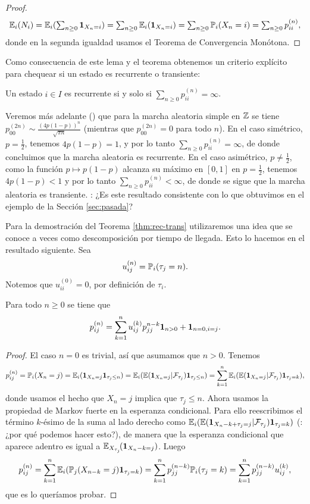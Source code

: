 \begin{proof}
\[\textstyle\mathbb{E}_i(N_i)=\mathbb{E}_i(\sum_{n\geq0}\mathbf{1}_{X_n=i})=\sum_{n\geq0}\mathbb{E}_i(\mathbf{1}_{X_n=i})=\sum_{n\geq0}\mathbb{P}_i(X_n=i)=\sum_{n\geq0}p_{ii}^{(n)},\]
donde en la segunda igualdad usamos el Teorema de Convergencia Monótona.
\end{proof}

Como consecuencia de este lema y el teorema obtenemos un criterio explícito para chequear si un estado es recurrente o transiente:

\begin{cor}
Un estado $i\in I$ es recurrente si y solo si $\sum_{n\geq0}p_{ii}^{(n)}=\infty$.
\end{cor}

\begin{ex}\label{eq:srw-rec-1}
Veremos más adelante (\ucmark) que para la marcha aleatoria simple en $\mathbb{Z}$ se tiene $p^{(2n)}_{00}\sim\frac{(4p(1-p))^n}{\sqrt{\pi n}}$ (mientras que $p^{(2n)}_{00}=0$ para todo $n$).
En el caso simétrico, $p=\frac12$, tenemos $4p(1-p)=1$, y por lo tanto $\sum_{n\geq0}p_{ii}^{(n)}=\infty$, de donde concluimos que la marcha aleatoria es recurrente.
En el caso asimétrico, $p\neq\frac12$, como la función $p\longmapsto p(1-p)$ alcanza su máximo en $[0,1]$ en $p=\frac12$, tenemos $4p(1-p)<1$ y por lo tanto $\sum_{n\geq0}p_{ii}^{(n)}<\infty$, de donde se sigue que la marcha aleatoria es transiente.
\uexer: ¿Es este resultado consistente con lo que obtuvimos en el ejemplo de la Sección \ref{sec:pasada}?
\end{ex}

Para la demostración del Teorema \ref{thm:rec-trans} utilizaremos una idea que se conoce a veces como descomposición por tiempo de llegada.
Esto lo hacemos en el resultado siguiente.
Sea
\[u^{(n)}_{ij}=\mathbb{P}_i(\tau_j=n).\]
Notemos que $u^{(0)}_{ii}=0$, por definición de $\tau_i$.

\begin{lem}
Para todo $n\geq0$ se tiene que
\[p_{ij}^{(n)}=\sum_{k=1}^nu_{ij}^{(k)}p_{jj}^{n-k}\mathbf{1}_{n>0}+\mathbf{1}_{n=0,i=j}.\]
\end{lem}

\begin{proof}
El caso $n=0$ es trivial, así que asumamos que $n>0$.
Tenemos
\[p_{ij}^{(n)}=\mathbb{P}_i(X_n=j)=\mathbb{E}_i(\mathbf{1}_{X_n=j}\mathbf{1}_{\tau_j\leq n})=\mathbb{E}_i(\mathbb{E}(\mathbf{1}_{X_n=j}|\mathcal{F}_{\tau_j})\mathbf{1}_{\tau_j\leq n})=\sum_{k=1}^n\mathbb{E}_i(\mathbb{E}(\mathbf{1}_{X_n=j}|\mathcal{F}_{\tau_j})\mathbf{1}_{\tau_j=k}),\]%
donde usamos el hecho que $X_n=j$ implica que $\tau_j\leq n$.
Ahora usamos la propiedad de Markov fuerte en la esperanza condicional.
Para ello reescribimos el término $k$-ésimo de la suma al lado derecho como $\mathbb{E}_i(\mathbb{E}(\mathbf{1}_{X_n-k+\tau_j=j}|\mathcal{F}_{\tau_j})\mathbf{1}_{\tau_j=k})$ (\uexers: ¿por qué podemos hacer esto?), de manera que la esperanza condicional que aparece adentro es igual a $\mathbb{E}_{X_{\tau_j}}\!(\mathbf{1}_{X_n-k=j})$.
Luego
\[p_{ij}^{(n)}=\sum_{k=1}^n\mathbb{E}_i(\mathbb{P}_j(X_{n-k}=j)\mathbf{1}_{\tau_j=k})=\sum_{k=1}^np^{(n-k)}_{jj}\mathbb{P}_i(\tau_j=k)=\sum_{k=1}^np^{(n-k)}_{jj}u_{ij}^{(k)},\]
que es lo queríamos probar.
\end{proof}

